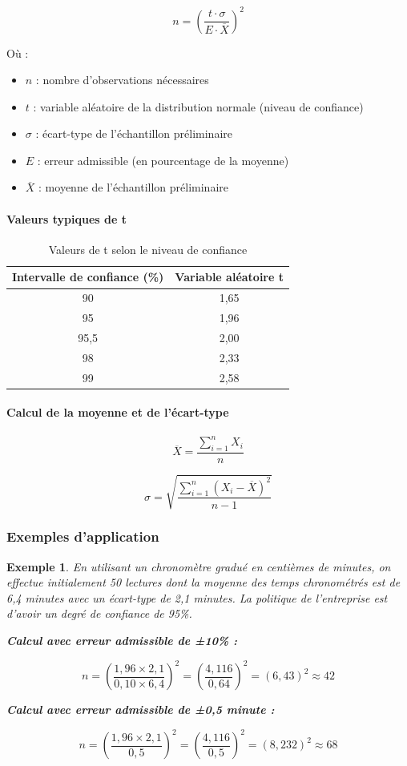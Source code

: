 \documentclass[a4paper,12pt]{article}
\newtheorem{exemple}{Exemple}[section]
\begin{document}
\[
n = \left( \frac{t \cdot \sigma}{E \cdot \overline{X}} \right)^2
\]

Où :
\begin{itemize}
    \item $n$ : nombre d'observations nécessaires
    \item $t$ : variable aléatoire de la distribution normale (niveau de confiance)
    \item $\sigma$ : écart-type de l'échantillon préliminaire
    \item $E$ : erreur admissible (en pourcentage de la moyenne)
    \item $\overline{X}$ : moyenne de l'échantillon préliminaire
\end{itemize}

\paragraph{Valeurs typiques de t}

\begin{table}[ht]
\centering
\begin{tabular}{|c|c|}
\hline
\textbf{Intervalle de confiance (\%)} & \textbf{Variable aléatoire t} \\
\hline
90 & 1,65 \\
95 & 1,96 \\
95,5 & 2,00 \\
98 & 2,33 \\
99 & 2,58 \\
\hline
\end{tabular}
\caption{Valeurs de t selon le niveau de confiance}
\end{table}

\paragraph{Calcul de la moyenne et de l'écart-type}

\[
\overline{X} = \frac{\sum_{i=1}^{n} X_i}{n}
\]

\[
\sigma = \sqrt{\frac{\sum_{i=1}^{n} (X_i - \overline{X})^2}{n-1}}
\]

\subsubsection{Exemples d'application}

\begin{exemple}
En utilisant un chronomètre gradué en centièmes de minutes, on effectue initialement 50 lectures dont la moyenne des temps chronométrés est de 6,4 minutes avec un écart-type de 2,1 minutes. La politique de l'entreprise est d'avoir un degré de confiance de 95\%.

\textbf{Calcul avec erreur admissible de ±10\% :}

\[
n = \left( \frac{1,96 \times 2,1}{0,10 \times 6,4} \right)^2 = \left( \frac{4,116}{0,64} \right)^2 = (6,43)^2 \approx 42
\]

\textbf{Calcul avec erreur admissible de ±0,5 minute :}

\[
n = \left( \frac{1,96 \times 2,1}{0,5} \right)^2 = \left( \frac{4,116}{0,5} \right)^2 = (8,232)^2 \approx 68
\]
\end{exemple}
\end{document}
